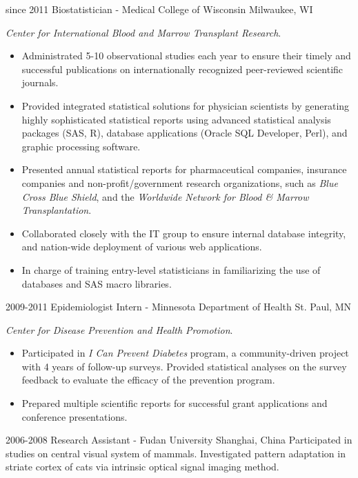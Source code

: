 \documentclass[11pt, print]{friggeri-cv}
\begin{document}
\begin{entrylist}
  \entry
    {since 2011}
    {Biostatistician - Medical College of Wisconsin}
    {Milwaukee, WI}
    {
    \textit{Center for International Blood and Marrow Transplant Research}.
    \begin{itemize}
      \item Administrated 5-10 observational studies each year to ensure their timely and successful publications on internationally recognized peer-reviewed scientific journals.
      \item Provided integrated statistical solutions for physician scientists by generating highly sophisticated statistical reports using advanced statistical analysis packages (SAS, R), database applications (Oracle SQL Developer, Perl), and graphic processing software.
      \item Presented annual statistical reports for pharmaceutical companies, insurance companies and non-profit/government research organizations, such as \textit{Blue Cross Blue Shield}, and the \textit{Worldwide Network for Blood \& Marrow Transplantation}.
      \item Collaborated closely with the IT group to ensure internal database integrity, and nation-wide deployment of various web applications.
      \item In charge of training entry-level statisticians in familiarizing the use of databases and SAS macro libraries.
    \end{itemize}
    }
  \entry
    {2009-2011}
    {Epidemiologist Intern - Minnesota Department of Health}
    {St. Paul, MN}
    {
    \textit{Center for Disease Prevention and Health Promotion}.
    \begin{itemize}
      \item Participated in \textit{I Can Prevent Diabetes} program, a community-driven project with 4 years of follow-up surveys. Provided statistical analyses on the survey feedback to evaluate the efficacy of the prevention program.
      \item Prepared multiple scientific reports for successful grant applications and conference presentations.
    \end{itemize}
    }
  \entry
    {2006-2008}
    {Research Assistant - Fudan University}
    {Shanghai, China}
    {Participated in studies on central visual system of mammals. Investigated pattern adaptation in striate cortex of cats via intrinsic optical signal imaging method.}
\end{entrylist}
\end{document}
